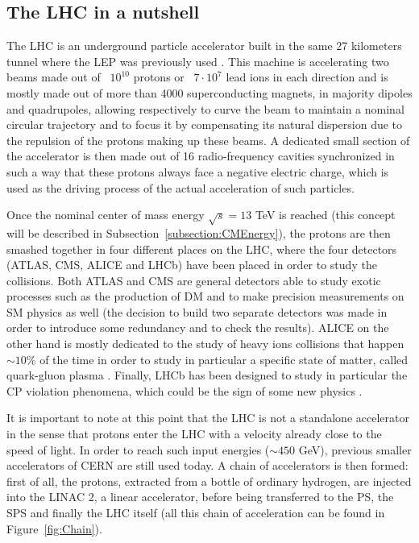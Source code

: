 \documentclass[a4paper, 10pt, openright]{report}
\begin{document}

\subsection{The \acs{LHC} in a nutshell}\label{section:LHCNut}

The \ac{LHC} is an underground particle accelerator built in the same 27 kilometers tunnel where the \ac{LEP} was previously used \cite{LEP}. This machine is accelerating two beams made out of ~$10^{10}$ protons or ~$7\cdot10^{7}$ lead ions in each direction and is mostly made out of more than 4000 superconducting magnets, in majority dipoles and quadrupoles, allowing respectively to curve the beam to maintain a nominal circular trajectory and to focus it by compensating its natural dispersion due to the repulsion of the protons making up these beams. A dedicated small section of the accelerator is then made out of 16 radio-frequency cavities synchronized in such a way that these protons always face a negative electric charge, which is used as the driving process of the actual acceleration of such particles.

Once the nominal center of mass energy $\sqrt{s} = 13$ TeV is reached (this concept will be described in Subsection~\ref{subsection:CMEnergy}), the protons are then smashed together in four different places on the \ac{LHC}, where the four detectors (\ac{ATLAS}, \ac{CMS}, \ac{ALICE} and LHCb) have been placed in order to study the collisions. Both \ac{ATLAS} and \ac{CMS} are general detectors able to study exotic processes such as the production of \ac{DM} and to make precision measurements on \ac{SM} physics as well (the decision to build two separate detectors was made in order to introduce some redundancy and to check the results). \ac{ALICE} on the other hand is mostly dedicated to the study of heavy ions collisions that happen $\sim 10$\% of the time in order to study in particular a specific state of matter, called quark-gluon plasma \cite{ALICE}. Finally, LHCb has been designed to study in particular the CP violation phenomena, which could be the sign of some new physics \cite{LHCb}.

It is important to note at this point that the \ac{LHC} is not a standalone accelerator in the sense that protons enter the \ac{LHC} with a velocity already close to the speed of light. In order to reach such input energies ($\sim 450$ GeV), previous smaller accelerators of \ac{CERN} are still used today. A chain of accelerators is then formed: first of all, the protons, extracted from a bottle of ordinary hydrogen, are injected into the LINAC 2, a linear accelerator, before being transferred to the \ac{PS}, the \ac{SPS} and finally the \ac{LHC} itself (all this chain of acceleration can be found in Figure~\ref{fig:Chain}).
\end{document}
